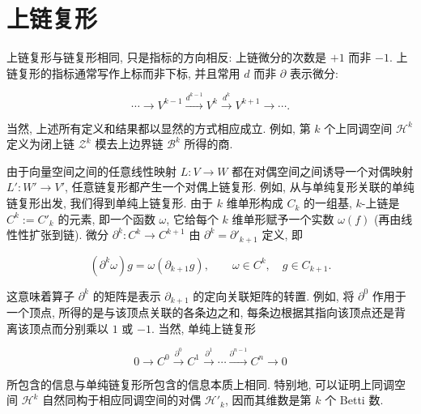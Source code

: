 \section{{上链复形}}\label{sec:cochain-complexes}

{上链复形与链复形相同, 只是指标的方向相反: 上链微分的次数是 $+1$ 而非 $-1$. 上链复形的指标通常写作上标而非下标, 并且常用 $d$ 而非 $\partial$ 表示微分:}

\[
\cdots\to V^{k-1}\xrightarrow{d^{k-1}}V^k\xrightarrow{d^k}V^{k+1}\to\cdots.
\]

{当然, 上述所有定义和结果都以显然的方式相应成立. 例如, 第 $k$ 个上同调空间 $\mathcal H^k$ 定义为闭上链 $\mathcal Z^k$ 模去上边界链 $\mathcal B^k$ 所得的商.}

{由于向量空间之间的任意线性映射 $L:V\to W$ 都在对偶空间之间诱导一个对偶映射 $L':W'\to V'$, 任意链复形都产生一个对偶上链复形. 例如, 从与单纯复形关联的单纯链复形出发, 我们得到单纯上链复形. 由于 $k$ 维单形构成 $C_k$ 的一组基, $k$-上链是 $C^k:=C'_k$ 的元素, 即一个函数 $\omega$, 它给每个 $k$ 维单形赋予一个实数 $\omega(f)$ (再由线性性扩张到链). 微分 $\partial^k:C^k\to C^{k+1}$ 由 $\partial^k=\partial'_{k+1}$ 定义, 即}

\[
(\partial^k\omega)g=\omega(\partial_{k+1}g),\qquad \omega\in C^k,\quad g\in C_{k+1}.
\]

{这意味着算子 $\partial^k$ 的矩阵是表示 $\partial_{k+1}$ 的定向关联矩阵的转置. 例如, 将 $\partial^0$ 作用于一个顶点, 所得的是与该顶点关联的各条边之和, 每条边根据其指向该顶点还是背离该顶点而分别乘以 $1$ 或 $-1$. 当然, 单纯上链复形}

\begin{equation}\label{eq:simplicial-cochain-complex}
0\to C^0\xrightarrow{\partial^0}C^1\xrightarrow{\partial^1}\cdots\xrightarrow{\partial^{n-1}}C^n\to0
\end{equation}

{所包含的信息与单纯链复形所包含的信息本质上相同. 特别地, 可以证明上同调空间 $\mathcal H^k$ 自然同构于相应同调空间的对偶 $\mathcal H'_k$, 因而其维数是第 $k$ 个 Betti 数.}

